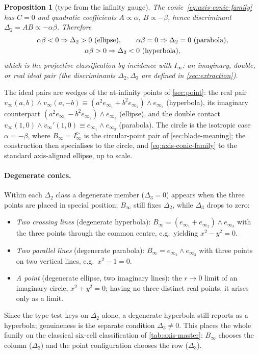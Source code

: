 \documentclass{birkjour}
\newtheorem{proposition}[theorem]{Proposition}
\theoremstyle{definition}
\theoremstyle{remark}
\newcommand{\Iinfd}{I_\infty^{\triangleright}}%
\newcommand{\Iinf}{I_\infty}
\newcommand{\joinp}{\wedge}
\begin{document}
\begin{proposition}[type from the infinity gauge]\label{prop:axis-type}
The conic~\eqref{eq:axis-conic-family} has $C=0$ and quadratic coefficients
$A\propto\alpha$, $B\propto-\beta$, hence discriminant
$\Delta_2 = AB \propto -\alpha\beta$. Therefore
\begin{gather}
  \alpha\beta<0 \Rightarrow \Delta_2>0\ (\text{ellipse}),\qquad
  \alpha\beta=0 \Rightarrow \Delta_2=0\ (\text{parabola}),\notag\\
  \alpha\beta>0 \Rightarrow \Delta_2<0\ (\text{hyperbola}),
\end{gather}
which is the projective classification by incidence with $\Iinf$: an imaginary,
double, or real ideal pair (the discriminants $\Delta_2,\Delta_3$ are defined in
\cref{sec:extraction}).
\end{proposition}

The ideal pairs are wedges of the at-infinity points of \cref{sec:point}: the real
pair $v_\infty(a,b)\joinp v_\infty(a,-b)\equiv(a^2 e_{\infty_1}+b^2 e_{\infty_2})\joinp e_{\infty_3}$
(hyperbola), its imaginary counterpart $(a^2 e_{\infty_1}-b^2 e_{\infty_2})\joinp e_{\infty_3}$
(ellipse), and the double contact $v_\infty(1,0)\joinp v_\infty'(1,0)\equiv e_{\infty_1}\joinp e_{\infty_3}$
(parabola). The circle is the isotropic case $\alpha=-\beta$, where $B_\infty=\Iinfd$
is the circular-point pair of \cref{sec:blade-meaning}; the construction then
specialises to the circle, and \eqref{eq:axis-conic-family} to the standard
axis-aligned ellipse, up to scale.

\paragraph{Degenerate conics.}
Within each $\Delta_2$ class a degenerate member ($\Delta_3=0$) appears when the
three points are placed in special position; $B_\infty$ still fixes $\Delta_2$,
while $\Delta_3$ drops to zero:
\begin{itemize}
  \item \emph{Two crossing lines} (degenerate hyperbola): $B_\infty=(e_{\infty_1}+e_{\infty_2})\joinp e_{\infty_3}$
    with the three points through the common centre, e.g.\ yielding $x^2-y^2=0$.
  \item \emph{Two parallel lines} (degenerate parabola): $B_\infty=e_{\infty_2}\joinp e_{\infty_3}$
    with three points on two vertical lines, e.g.\ $x^2-1=0$.
  \item \emph{A point} (degenerate ellipse, two imaginary lines): the $r\to0$ limit
    of an imaginary circle, $x^2+y^2=0$; having no three distinct real points, it
    arises only as a limit.
\end{itemize}
Since the type test keys on $\Delta_2$ alone, a degenerate hyperbola still reports
as a hyperbola; genuineness is the separate condition $\Delta_3\neq0$. This places
the whole family on the classical six-cell classification of
\cref{tab:axis-master}: $B_\infty$ chooses the column ($\Delta_2$) and the point
configuration chooses the row ($\Delta_3$).
\end{document}
